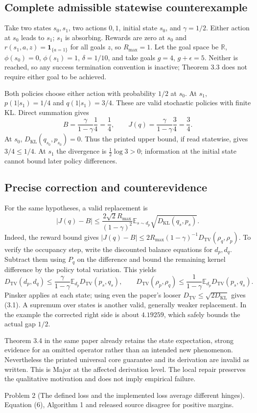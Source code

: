 \documentclass[10pt]{article}
\begin{document}
\subsection*{Complete admissible statewise counterexample}
Take two states \(s_0,s_1\), two actions \(0,1\), initial state \(s_0\), and \(\gamma=1/2\). Either action at \(s_0\) leads to \(s_1\); \(s_1\) is absorbing. Rewards are zero at \(s_0\) and \(r(s_1,a,z)=\mathbf1_{\{a=1\}}\) for all goals \(z\), so \(R_{\max}=1\). Let the goal space be \(\mathbb R\), \(\phi(s_0)=0\), \(\phi(s_1)=1\), \(\delta=1/10\), and take goals \(g=4\), \(g+\epsilon=5\). Neither is reached, so any success termination convention is inactive; Theorem 3.3 does not require either goal to be achieved.\par
Both policies choose either action with probability \(1/2\) at \(s_0\). At \(s_1\), \(p(1|s_1)=1/4\) and \(q(1|s_1)=3/4\). These are valid stochastic policies with finite KL. Direct summation gives \[B=\frac{\gamma}{1-\gamma}\frac14=\frac14,\qquad
 J(q)=\frac{\gamma}{1-\gamma}\frac34=\frac34.\] At \(s_0\), \(D_{\mathrm{KL}}(q_{s_0},p_{s_0})=0\). Thus the printed upper bound, if read statewise, gives \(3/4\le1/4\). At \(s_1\) the divergence is \(\frac12\log3>0\); information at the initial state cannot bound later policy differences.\par
\subsection*{Precise correction and counterevidence}
For the same hypotheses, a valid replacement is \[|J(q)-B|\le
 \frac{2\sqrt2R_{\max}}{(1-\gamma)^2}
 \mathbb E_{s\sim d_p}\sqrt{D_{\mathrm{KL}}(q_s,p_s)} .\] Indeed, the reward bound gives \(|J(q)-B|\le2R_{\max}(1-\gamma)^{-1}D_{\mathrm{TV}}(\rho_q,\rho_p)\). To verify the occupancy step, write the discounted balance equations for \(d_p,d_q\). Subtract them using \(P_q\) on the difference and bound the remaining kernel difference by the policy total variation. This yields \[D_{\mathrm{TV}}(d_p,d_q)
 \le\frac{\gamma}{1-\gamma}\mathbb E_{d_p}D_{\mathrm{TV}}(p_s,q_s),
 \qquad
 D_{\mathrm{TV}}(\rho_p,\rho_q)
 \le\frac1{1-\gamma}\mathbb E_{d_p}D_{\mathrm{TV}}(p_s,q_s).\] Pinsker applies at each state; using even the paper’s looser \(D_{\mathrm{TV}}\le\sqrt{2D_{\mathrm{KL}}}\) gives (3.1). A supremum over states is another valid, generally weaker replacement. In the example the corrected right side is about \(4.19259\), which safely bounds the actual gap \(1/2\).\par
Theorem 3.4 in the same paper already retains the state expectation, strong evidence for an omitted operator rather than an intended new phenomenon. Nevertheless the printed universal core guarantee and its derivation are invalid as written. This is Major at the affected derivation level. The local repair preserves the qualitative motivation and does not imply empirical failure.\par
Problem 2 (The defined loss and the implemented loss average different hinges).  Equation (6), Algorithm 1 and released source disagree for positive margins.\par
\end{document}
